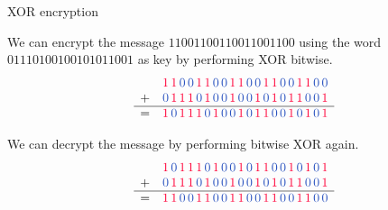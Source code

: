 \documentclass{beamer}
\newcommand{\coloredOne}{{\color{carminered} 1}}
\newcommand{\coloredZero}{{\color{ceruleanblue} 0}}
\begin{document}
\begin{frame}{XOR encryption}

We can encrypt the message $11001100110011001100$ using the word 
$01110100100101011001$ as key by performing XOR bitwise.
\begin{equation*}
\begin{array}{rl}
  & \coloredOne \,\coloredOne\, \coloredZero \, \coloredZero \,\coloredOne\,\coloredOne\, \coloredZero \, \coloredZero \,\coloredOne\,\coloredOne\, \coloredZero \, \coloredZero \,\coloredOne\,\coloredOne\, \coloredZero \, \coloredZero \,\coloredOne\,\coloredOne\, \coloredZero \, \coloredZero \\
+ & \coloredZero \,\coloredOne\,\coloredOne\,\coloredOne\, \coloredZero \,\coloredOne\, \coloredZero \, \coloredZero \,\coloredOne\, \coloredZero \, \coloredZero \,\coloredOne\, \coloredZero \,\coloredOne\, \coloredZero \,\coloredOne\,\coloredOne\, \coloredZero \, \coloredZero \,\coloredOne\\ \hline
= &  \coloredOne \, \coloredZero \,\coloredOne\,\coloredOne\,\coloredOne\, \coloredZero \,\coloredOne\, \coloredZero \, \coloredZero \,\coloredOne\, \coloredZero \,\coloredOne\,\coloredOne\, \coloredZero \, \coloredZero \,\coloredOne\, \coloredZero \,\coloredOne\, \coloredZero \,\coloredOne
\end{array}
\end{equation*}

\pause
We can decrypt the message by performing bitwise XOR again.
\begin{equation*}
\begin{array}{rl}
  & \coloredOne\,\coloredZero\,\coloredOne\,\coloredOne\,\coloredOne\,\coloredZero\,\coloredOne\,\coloredZero\,\coloredZero\,\coloredOne\,\coloredZero\,\coloredOne\,\coloredOne\,\coloredZero\,\coloredZero\,\coloredOne\,\coloredZero\,\coloredOne\,\coloredZero\,\coloredOne \\
+ & \coloredZero \,\coloredOne\,\coloredOne\,\coloredOne\,\coloredZero\,\coloredOne\,\coloredZero\,\coloredZero\,\coloredOne\,\coloredZero\,\coloredZero\,\coloredOne\,\coloredZero\,\coloredOne\,\coloredZero\,\coloredOne\,\coloredOne\,\coloredZero\,\coloredZero\,\coloredOne\\ \hline
= & \coloredOne\,\coloredOne\,\coloredZero\,\coloredZero\,\coloredOne\,\coloredOne\,\coloredZero\,\coloredZero\,\coloredOne\,\coloredOne\,\coloredZero\,\coloredZero\,\coloredOne\,\coloredOne\,\coloredZero\,\coloredZero\,\coloredOne\,\coloredOne\,\coloredZero\,\coloredZero
\end{array}
\end{equation*}

\end{frame}
\end{document}
